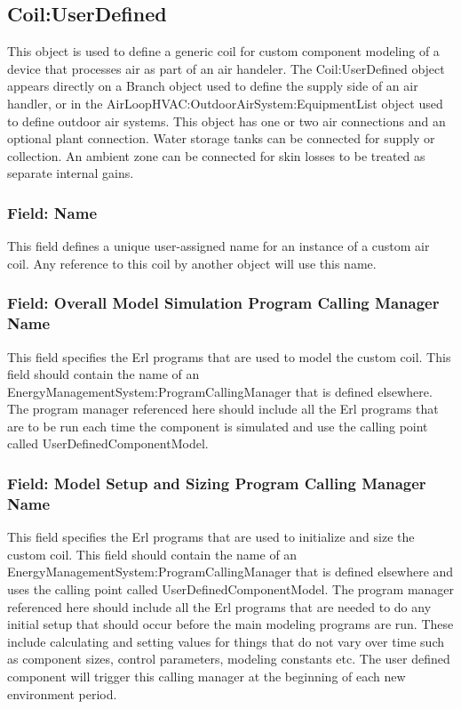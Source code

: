\subsection{Coil:UserDefined}\label{coiluserdefined}

This object is used to define a generic coil for custom component modeling of a device that processes air as part of an air handeler. The Coil:UserDefined object appears directly on a Branch object used to define the supply side of an air handler, or in the AirLoopHVAC:OutdoorAirSystem:EquipmentList object used to define outdoor air systems. This object has one or two air connections and an optional plant connection. Water storage tanks can be connected for supply or collection. An ambient zone can be connected for skin losses to be treated as separate internal gains.

\subsubsection{Field: Name}\label{field-name-2-041}

This field defines a unique user-assigned name for an instance of a custom air coil. Any reference to this coil by another object will use this name.

\subsubsection{Field: Overall Model Simulation Program Calling Manager Name}\label{field-overall-model-simulation-program-calling-manager-name-2}

This field specifies the Erl programs that are used to model the custom coil. This field should contain the name of an EnergyManagementSystem:ProgramCallingManager that is defined elsewhere. The program manager referenced here should include all the Erl programs that are to be run each time the component is simulated and use the calling point called UserDefinedComponentModel.

\subsubsection{Field: Model Setup and Sizing Program Calling Manager Name}\label{field-model-setup-and-sizing-program-calling-manager-name-2}

This field specifies the Erl programs that are used to initialize and size the custom coil. This field should contain the name of an EnergyManagementSystem:ProgramCallingManager that is defined elsewhere and uses the calling point called UserDefinedComponentModel. The program manager referenced here should include all the Erl programs that are needed to do any initial setup that should occur before the main modeling programs are run. These include calculating and setting values for things that do not vary over time such as component sizes, control parameters, modeling constants etc. The user defined component will trigger this calling manager at the beginning of each new environment period.

